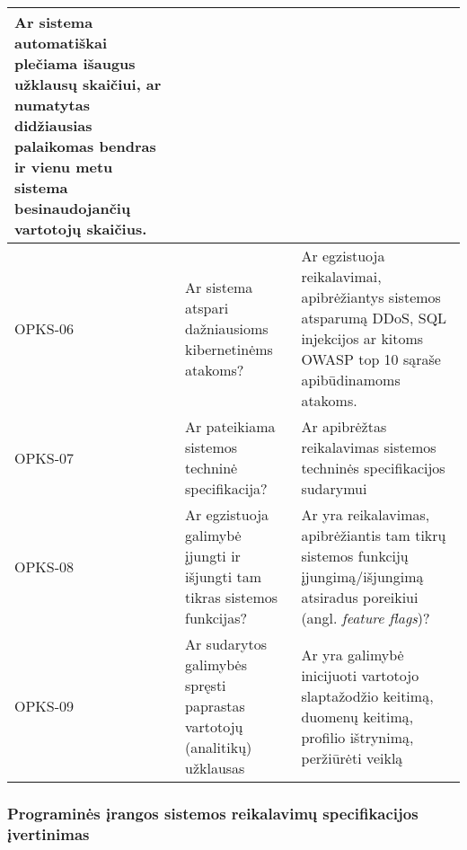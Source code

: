 \documentclass{VUMIFPSkursinis}
\begin{document}
\begin{center}
\begin{longtable}{|C{2cm}|L{5cm}|L{8cm}|}
		Ar sistema automatiškai plečiama išaugus užklausų skaičiui, ar numatytas didžiausias palaikomas bendras ir vienu metu sistema besinaudojančių vartotojų skaičius.                             \\ \hline
		OPKS-06                                                                                                 &
		Ar sistema atspari dažniausioms kibernetinėms atakoms?                                                  &
		Ar egzistuoja reikalavimai, apibrėžiantys sistemos atsparumą DDoS, SQL injekcijos ar kitoms OWASP top 10 sąraše apibūdinamoms atakoms.                                                        \\ \hline
		OPKS-07                                                                                                 &
		Ar pateikiama sistemos techninė specifikacija?                                                          &
		Ar apibrėžtas reikalavimas sistemos techninės specifikacijos sudarymui                                                                                                                        \\ \hline
		OPKS-08                                                                                                 &
		Ar egzistuoja galimybė įjungti ir išjungti tam tikras sistemos funkcijas?                               &
		Ar yra reikalavimas, apibrėžiantis tam tikrų sistemos funkcijų įjungimą/išjungimą atsiradus poreikiui (angl. \textit{feature flags})?                                                         \\ \hline
		OPKS-09                                                                                                 &
		Ar sudarytos galimybės spręsti paprastas vartotojų (analitikų) užklausas                                            &
		Ar yra galimybė inicijuoti vartotojo slaptažodžio keitimą, duomenų keitimą, profilio ištrynimą, peržiūrėti veiklą                                                                             \\ \hline
	\end{longtable}
\end{center}

\subsubsection{Programinės įrangos sistemos reikalavimų specifikacijos įvertinimas}
\end{document}
